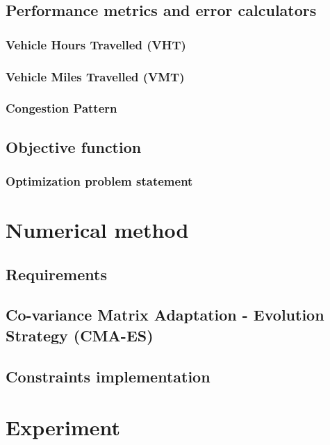 \subsection{Performance metrics and error calculators}
\label{subsec:pcs_intro}

\subsubsection{Vehicle Hours Travelled (VHT)}
\label{subsubsec:tvh}

\subsubsection{Vehicle Miles Travelled (VMT)}
\label{subsubsec:tvm}

\subsubsection{Congestion Pattern}
\label{subsubsec:cp}

\subsection{Objective function}
\label{fitnessintro}

\subsubsection{Optimization problem statement}
\label{subsubsec:statement}



\section{Numerical method}
\subsection{Requirements}
\label{subsec:requirements}

\subsection{Co-variance Matrix Adaptation - Evolution Strategy (CMA-ES)}
\label{subsec:cmaes}

\subsection{Constraints implementation}
\label{subsec:implementation}

\section{Experiment}
